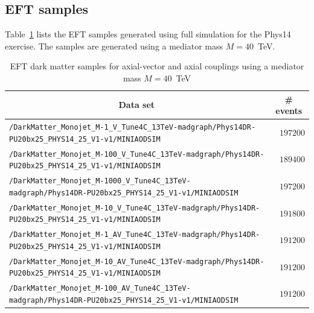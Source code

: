 \subsection{EFT samples}
Table~\ref{tab:datasets_dm} lists the EFT samples generated using full simulation for the Phys14 exercise. The samples are generated using a mediator mass $M=40$~TeV.
\begin{table}
    \centering
    \caption{EFT dark matter samples for axial-vector and axial couplings using a mediator mass $M=40$~TeV \label{tab:datasets_dm}}
    \begin{tabular}{lr}
      \hline\hline
      \multicolumn{1}{c}{Data set}&\multicolumn{1}{c}{\# events}\tabularnewline
      \hline
      {\footnotesize \verb!/DarkMatter_Monojet_M-1_V_Tune4C_13TeV-madgraph/Phys14DR-PU20bx25_PHYS14_25_V1-v1/MINIAODSIM!   } &$197200$\tabularnewline
      {\footnotesize \verb!/DarkMatter_Monojet_M-100_V_Tune4C_13TeV-madgraph/Phys14DR-PU20bx25_PHYS14_25_V1-v1/MINIAODSIM! } &$189400$\tabularnewline
      {\footnotesize \verb!/DarkMatter_Monojet_M-1000_V_Tune4C_13TeV-madgraph/Phys14DR-PU20bx25_PHYS14_25_V1-v1/MINIAODSIM!} &$197200$\tabularnewline
      {\footnotesize \verb!/DarkMatter_Monojet_M-10_V_Tune4C_13TeV-madgraph/Phys14DR-PU20bx25_PHYS14_25_V1-v1/MINIAODSIM!  } &$191800$\tabularnewline
      {\footnotesize \verb!/DarkMatter_Monojet_M-1_AV_Tune4C_13TeV-madgraph/Phys14DR-PU20bx25_PHYS14_25_V1-v1/MINIAODSIM!  } &$191200$\tabularnewline
      {\footnotesize \verb!/DarkMatter_Monojet_M-10_AV_Tune4C_13TeV-madgraph/Phys14DR-PU20bx25_PHYS14_25_V1-v1/MINIAODSIM! } &$191200$\tabularnewline
      {\footnotesize \verb!/DarkMatter_Monojet_M-100_AV_Tune4C_13TeV-madgraph/Phys14DR-PU20bx25_PHYS14_25_V1-v1/MINIAODSIM!} &$191200$\tabularnewline
\hline
\end{tabular}
\end{table}


